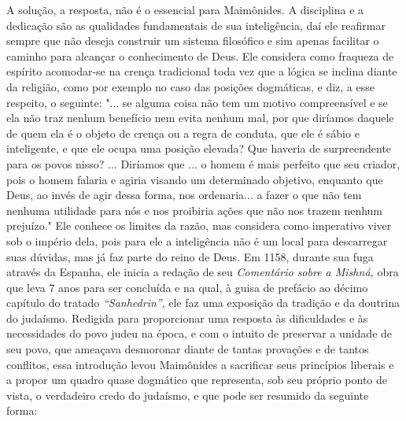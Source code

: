 A solução, a resposta, não é o essencial para Maimônides. A disciplina
e a dedicação são as qualidades fundamentais de sua inteligência, daí
ele reafirmar
sempre que não deseja construir um sistema filosófico e sim
apenas facilitar
o caminho para alcançar o conhecimento de Deus. Ele considera como
fraqueza de espírito acomodar-se na crença tradicional toda vez que a lógica
se inclina diante da religião, como por exemplo no caso das posições
dogmáticas, e diz, a esse respeito, o seguinte: "... se alguma coisa não tem um motivo
compreensível e se ela não traz nenhum benefício nem evita nenhum mal, por
que diríamos daquele de quem ela é o objeto de crença ou a regra de conduta,
que ele é sábio e inteligente, e que ele ocupa uma posição elevada? Que haveria
de surpreendente para os povos nisso? ... Diríamos que ... o homem é
mais perfeito que seu criador, pois o homem falaria e agiria visando um determinado
objetivo, enquanto que Deus, ao invés de agir dessa forma, nos ordenaria...
a fazer o que não tem nenhuma utilidade para nós e nos proibiria ações que
não nos trazem nenhum prejuízo." Ele conhece os limites da razão, mas
considera
como imperativo viver sob o império dela, pois para ele a
inteligência não
é um local para descarregar suas dúvidas, mas já faz parte do reino de Deus.
Em 1158, durante sua fuga através da Espanha, ele inicia a redação
de seu \emph{Comentário sobre a Mishná,} obra que leva 7 anos para ser
concluída e na qual, à guisa de prefácio ao décimo capítulo do tratado
\emph{``Sanhedrin''}, ele faz uma exposição da tradição e da doutrina do
judaísmo. Redigida para pro­porcionar uma resposta às dificuldades e às
necessidades do povo judeu na épo­ca, e com o intuito de preservar a
unidade de seu povo, que ameaçava desmo­ronar diante de tantas provações
e de tantos conflitos, essa introdução levou Maimônides a sacrificar
seus princípios liberais e a propor um quadro quase dogmático que
representa, sob seu próprio ponto de vista, o verdadeiro credo do
judaísmo, e que pode ser resumido da seguinte forma:

